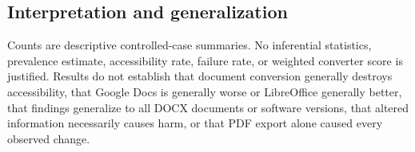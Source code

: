 \subsection{Interpretation and generalization}

Counts are descriptive controlled-case summaries. No inferential statistics, prevalence estimate, accessibility rate, failure rate, or weighted converter score is justified. Results do not establish that document conversion generally destroys accessibility, that Google Docs is generally worse or LibreOffice generally better, that findings generalize to all DOCX documents or software versions, that altered information necessarily causes harm, or that PDF export alone caused every observed change.

